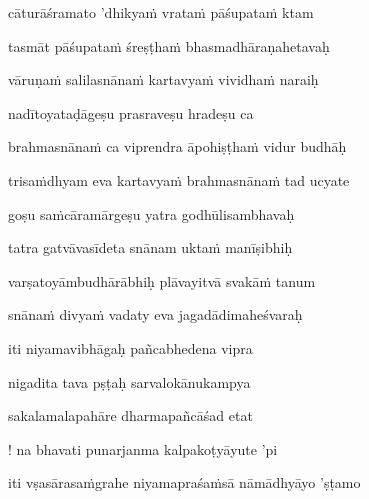 cāturāśramato 'dhikya\.m vrata\.m pāśupata\.m ktam\thinspace{\dandab} \dontdisplaylinenum

tasmāt pāśupata\.m śreṣṭha\.m bhasmadhāraṇahetavaḥ \veg\dontdisplaylinenum

vāruṇa\.m salilasnāna\.m kartavya\.m vividha\.m naraiḥ\thinspace{\dandab} \dontdisplaylinenum

nadītoyataḍāgeṣu prasraveṣu hradeṣu ca \veg\dontdisplaylinenum

brahmasnāna\.m ca viprendra āpohiṣṭha\.m vidur budhāḥ\thinspace{\dandab} \dontdisplaylinenum

trisa\.mdhyam eva kartavya\.m brahmasnāna\.m tad ucyate \veg\dontdisplaylinenum

goṣu sa\.mcāramārgeṣu yatra godhūlisambhavaḥ\thinspace{\dandab} \dontdisplaylinenum

tatra gatvāvasīdeta snānam ukta\.m manīṣibhiḥ \veg\dontdisplaylinenum

varṣatoyāmbudhārābhiḥ plāvayitvā svakā\.m tanum\thinspace{\dandab} \dontdisplaylinenum

snāna\.m divya\.m vadaty eva jagadādimaheśvaraḥ \veg\dontdisplaylinenum

\ujvers\nemsloka 
iti niyamavibhāgaḥ pañcabhedena vipra
\dontdisplaylinenum

\nemslokab 
nigadita tava pṣṭaḥ sarvalokānukampya \danda\dontdisplaylinenum

\nemslokac 
sakalamalapahāre dharmapañcāśad etat
\dontdisplaylinenum

\nemslokad 
! na bhavati punarjanma kalpakoṭyāyute 'pi \veg\dontdisplaylinenum

\vers


\jump
\begin{center}
\ketdanda iti vṣasārasa\.mgrahe niyamapraśa\.msā nāmādhyāyo 'ṣṭamo\ketdanda
\end{center}
\dontdisplaylinenum\vers 
\bekveg\szamveg\vfill\phpspagebreak\szam\bek{}
\thispagestyle{empty}



